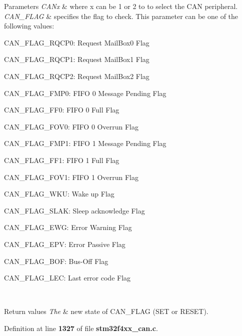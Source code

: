 \begin{DoxyParams}{Parameters}
{\em C\+A\+Nx} & where x can be 1 or 2 to to select the C\+AN peripheral. \\
\hline
{\em C\+A\+N\+\_\+\+F\+L\+AG} & specifies the flag to check. This parameter can be one of the following values\+: \begin{DoxyItemize}
\item C\+A\+N\+\_\+\+F\+L\+A\+G\+\_\+\+R\+Q\+C\+P0\+: Request Mail\+Box0 Flag \item C\+A\+N\+\_\+\+F\+L\+A\+G\+\_\+\+R\+Q\+C\+P1\+: Request Mail\+Box1 Flag \item C\+A\+N\+\_\+\+F\+L\+A\+G\+\_\+\+R\+Q\+C\+P2\+: Request Mail\+Box2 Flag \item C\+A\+N\+\_\+\+F\+L\+A\+G\+\_\+\+F\+M\+P0\+: F\+I\+FO 0 Message Pending Flag \item C\+A\+N\+\_\+\+F\+L\+A\+G\+\_\+\+F\+F0\+: F\+I\+FO 0 Full Flag \item C\+A\+N\+\_\+\+F\+L\+A\+G\+\_\+\+F\+O\+V0\+: F\+I\+FO 0 Overrun Flag \item C\+A\+N\+\_\+\+F\+L\+A\+G\+\_\+\+F\+M\+P1\+: F\+I\+FO 1 Message Pending Flag \item C\+A\+N\+\_\+\+F\+L\+A\+G\+\_\+\+F\+F1\+: F\+I\+FO 1 Full Flag \item C\+A\+N\+\_\+\+F\+L\+A\+G\+\_\+\+F\+O\+V1\+: F\+I\+FO 1 Overrun Flag \item C\+A\+N\+\_\+\+F\+L\+A\+G\+\_\+\+W\+KU\+: Wake up Flag \item C\+A\+N\+\_\+\+F\+L\+A\+G\+\_\+\+S\+L\+AK\+: Sleep acknowledge Flag \item C\+A\+N\+\_\+\+F\+L\+A\+G\+\_\+\+E\+WG\+: Error Warning Flag \item C\+A\+N\+\_\+\+F\+L\+A\+G\+\_\+\+E\+PV\+: Error Passive Flag \item C\+A\+N\+\_\+\+F\+L\+A\+G\+\_\+\+B\+OF\+: Bus-\/\+Off Flag \item C\+A\+N\+\_\+\+F\+L\+A\+G\+\_\+\+L\+EC\+: Last error code Flag \end{DoxyItemize}
\\
\hline
\end{DoxyParams}

\begin{DoxyRetVals}{Return values}
{\em The} & new state of C\+A\+N\+\_\+\+F\+L\+AG (S\+ET or R\+E\+S\+ET). \\
\hline
\end{DoxyRetVals}


Definition at line \textbf{ 1327} of file \textbf{ stm32f4xx\+\_\+can.\+c}.




